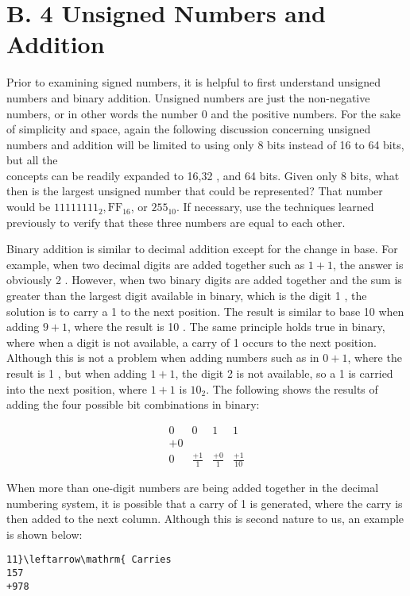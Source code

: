 \documentclass[10pt]{article}
\begin{document}
\section*{B. 4 Unsigned Numbers and Addition}
Prior to examining signed numbers, it is helpful to first understand unsigned numbers and binary addition. Unsigned numbers are just the non-negative numbers, or in other words the number 0 and the positive numbers. For the sake of simplicity and space, again the following discussion concerning unsigned numbers and addition will be limited to using only 8 bits instead of 16 to 64 bits, but all the\\
concepts can be readily expanded to 16,32 , and 64 bits. Given only 8 bits, what then is the largest unsigned number that could be represented? That number would be $11111111_{2}, \mathrm{FF}_{16}$, or $255_{10}$. If necessary, use the techniques learned previously to verify that these three numbers are equal to each other.

Binary addition is similar to decimal addition except for the change in base. For example, when two decimal digits are added together such as $1+1$, the answer is obviously 2 . However, when two binary digits are added together and the sum is greater than the largest digit available in binary, which is the digit 1 , the solution is to carry a 1 to the next position. The result is similar to base 10 when adding $9+1$, where the result is 10 . The same principle holds true in binary, where when a digit is not available, a carry of 1 occurs to the next position. Although this is not a problem when adding numbers such as in $0+1$, where the result is 1 , but when adding $1+1$, the digit 2 is not available, so a 1 is carried into the next position, where $1+1$ is $10_{2}$. The following shows the results of adding the four possible bit combinations in binary:

$$
\begin{array}{rrrr}
0 & 0 & 1 & 1 \\
+0 \\
\hline 0 & \frac{+1}{1} & \frac{+0}{1} & \frac{+1}{10}
\end{array}
$$

When more than one-digit numbers are being added together in the decimal numbering system, it is possible that a carry of 1 is generated, where the carry is then added to the next column. Although this is second nature to us, an example is shown below:

\begin{verbatim}
11}\leftarrow\mathrm{ Carries
157
+978
\end{verbatim}
\end{document}
